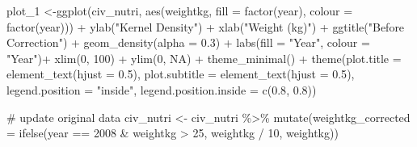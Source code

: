 \documentclass[
  letterpaper,
  DIV=11,
  numbers=noendperiod]{scrartcl}
\newenvironment{Shaded}{\begin{snugshade}}{\end{snugshade}}
\newcommand{\AttributeTok}[1]{\textcolor[rgb]{0.40,0.45,0.13}{#1}}
\newcommand{\CommentTok}[1]{\textcolor[rgb]{0.37,0.37,0.37}{#1}}
\newcommand{\ConstantTok}[1]{\textcolor[rgb]{0.56,0.35,0.01}{#1}}
\newcommand{\DecValTok}[1]{\textcolor[rgb]{0.68,0.00,0.00}{#1}}
\newcommand{\FloatTok}[1]{\textcolor[rgb]{0.68,0.00,0.00}{#1}}
\newcommand{\FunctionTok}[1]{\textcolor[rgb]{0.28,0.35,0.67}{#1}}
\newcommand{\NormalTok}[1]{\textcolor[rgb]{0.00,0.23,0.31}{#1}}
\newcommand{\OtherTok}[1]{\textcolor[rgb]{0.00,0.23,0.31}{#1}}
\newcommand{\SpecialCharTok}[1]{\textcolor[rgb]{0.37,0.37,0.37}{#1}}
\newcommand{\StringTok}[1]{\textcolor[rgb]{0.13,0.47,0.30}{#1}}
\begin{document}
\begin{Shaded}
\begin{Highlighting}[]
\NormalTok{plot\_1 }\OtherTok{\textless{}{-}}\FunctionTok{ggplot}\NormalTok{(civ\_nutri, }\FunctionTok{aes}\NormalTok{(weightkg, }\AttributeTok{fill =} \FunctionTok{factor}\NormalTok{(year), }\AttributeTok{colour =} \FunctionTok{factor}\NormalTok{(year))) }\SpecialCharTok{+} \FunctionTok{ylab}\NormalTok{(}\StringTok{"Kernel Density"}\NormalTok{) }\SpecialCharTok{+} \FunctionTok{xlab}\NormalTok{(}\StringTok{"Weight (kg)"}\NormalTok{) }\SpecialCharTok{+} \FunctionTok{ggtitle}\NormalTok{(}\StringTok{"Before Correction"}\NormalTok{) }\SpecialCharTok{+}
  \FunctionTok{geom\_density}\NormalTok{(}\AttributeTok{alpha =} \FloatTok{0.3}\NormalTok{) }\SpecialCharTok{+}
  \FunctionTok{labs}\NormalTok{(}\AttributeTok{fill =} \StringTok{"Year"}\NormalTok{, }\AttributeTok{colour =} \StringTok{"Year"}\NormalTok{)}\SpecialCharTok{+}
  \FunctionTok{xlim}\NormalTok{(}\DecValTok{0}\NormalTok{, }\DecValTok{100}\NormalTok{) }\SpecialCharTok{+} \FunctionTok{ylim}\NormalTok{(}\DecValTok{0}\NormalTok{, }\ConstantTok{NA}\NormalTok{) }\SpecialCharTok{+} \FunctionTok{theme\_minimal}\NormalTok{() }\SpecialCharTok{+}
  \FunctionTok{theme}\NormalTok{(}\AttributeTok{plot.title =} \FunctionTok{element\_text}\NormalTok{(}\AttributeTok{hjust =} \FloatTok{0.5}\NormalTok{), }\AttributeTok{plot.subtitle =} \FunctionTok{element\_text}\NormalTok{(}\AttributeTok{hjust =} \FloatTok{0.5}\NormalTok{), }\AttributeTok{legend.position =} \StringTok{"inside"}\NormalTok{, }\AttributeTok{legend.position.inside =} \FunctionTok{c}\NormalTok{(}\FloatTok{0.8}\NormalTok{, }\FloatTok{0.8}\NormalTok{))}

\CommentTok{\# update original data}
\NormalTok{civ\_nutri }\OtherTok{\textless{}{-}}\NormalTok{ civ\_nutri }\SpecialCharTok{\%\textgreater{}\%} \FunctionTok{mutate}\NormalTok{(}\AttributeTok{weightkg\_corrected =} \FunctionTok{ifelse}\NormalTok{(year }\SpecialCharTok{==} \DecValTok{2008} \SpecialCharTok{\&}\NormalTok{ weightkg }\SpecialCharTok{\textgreater{}} \DecValTok{25}\NormalTok{, weightkg }\SpecialCharTok{/} \DecValTok{10}\NormalTok{, weightkg))}


\end{Highlighting}
\end{Shaded}
\end{document}
